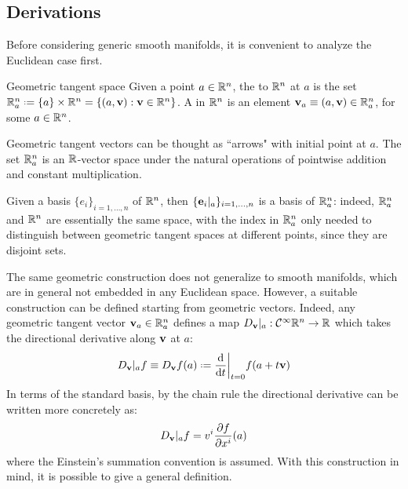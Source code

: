 \subsection{Derivations}

Before considering generic smooth manifolds, it is convenient to analyze the Euclidean case first.

\begin{definition}{Geometric tangent space}{}
  Given a point $ a \in \mathbb{R}^n $, the  to $ \mathbb{R}^n $ at $ a $ is the set $ \R^n_a \defeq \{a\} \times \R^n = \{(a,\ve{v}) : \ve{v} \in \R^n\} $. A  in $ \mathbb{R}^n $ is an element $ \mathbf{v}_a \equiv (a,\mathbf{v}) \in \mathbb{R}^n_a $, for some $ a \in \mathbb{R}^n $.
\end{definition}

Geometric tangent vectors can be thought as ``arrows" with initial point at $ a $. The set $ \mathbb{R}^n_a $ is an $ \mathbb{R} $-vector space under the natural operations of pointwise addition and constant multiplication.

Given a basis $ \{e_i\}_{i = 1 , \dots , n} $ of $ \mathbb{R}^n $, then $ \{\mathbf{e}_i \vert_a\}_{i = 1 , \dots , n} $ is a basis of $ \mathbb{R}^n_a $: indeed, $ \mathbb{R}^n_a $ and $ \mathbb{R}^n $ are essentially the same space, with the index in $ \mathbb{R}^n_a $ only needed to distinguish between geometric tangent spaces at different points, since they are disjoint sets.

The same geometric construction does not generalize to smooth manifolds, which are in general not embedded in any Euclidean space. However, a suitable construction can be defined starting from geometric vectors. Indeed, any geometric tangent vector $ \mathbf{v}_a \in \mathbb{R}^n_a $ defines a map $ D_{\mathbf{v}}\vert_a : \mathcal{C}^{\infty}{\mathbb{R}^n} \rightarrow \mathbb{R} $ which takes the directional derivative along $ \mathbf{v} $ at $ a $:
\begin{equation}
  D_\ve{v} \vert_a f \equiv D_\ve{v} f(a) \defeq \frac{\dd}{\dd t} \bigg\vert_{t = 0} f(a + t \ve{v})
  \label{eq:directional-derivative}
\end{equation}
In terms of the standard basis, by the chain rule the directional derivative can be written more concretely as:
\begin{equation}
  D_{\mathbf{v}} \vert_a f = v^i \frac{\partial f}{\partial x^i}(a)
  \label{eq:directional-derivative-component}
\end{equation}
where the Einstein's summation convention is assumed. With this construction in mind, it is possible to give a general definition.

